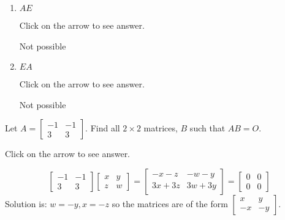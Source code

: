 \documentclass{ximera}
\begin{document}
\begin{problem}
\begin{enumerate}
\item $AE$

Click on the arrow to see answer.
\begin{expandable}{}{}
Not possible
\end{expandable}

\item $EA$

Click on the arrow to see answer.
\begin{expandable}{}{}
Not possible
\end{expandable}

\end{enumerate}
\end{problem}


\begin{problem}\label{prb:4.12} Let $A=\left[
\begin{array}{rr}
-1 & -1 \\
3 & 3
\end{array}
\right] $. Find all $2\times 2$ matrices, $B$
such that $AB=O.$

Click on the arrow to see answer.
\begin{expandable}{}{}
$$
\left[
\begin{array}{rr}
-1 & -1 \\
3 & 3
\end{array}
\right] \left[
\begin{array}{cc}
x & y \\
z & w
\end{array}
\right]  =\left[
\begin{array}{cc}
-x-z & -w-y \\
3x+3z & 3w+3y
\end{array}
\right] 
=\left[
\begin{array}{cc}
0 & 0 \\
0 & 0
\end{array}
\right]
$$
Solution is: $ w=-y,x=-z $ so the
matrices are of the form $\left[
\begin{array}{rr}
x & y \\
-x & -y
\end{array}
\right].$
\end{expandable}
\end{problem}
\end{document}
